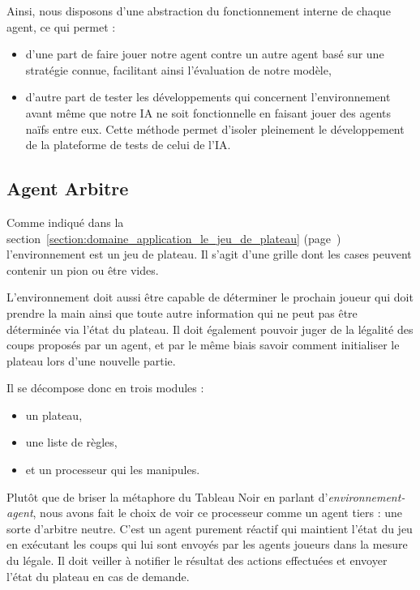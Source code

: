 Ainsi, nous disposons d'une abstraction du fonctionnement interne de chaque agent, ce qui permet :
\begin{itemize}
\item d'une part de faire jouer notre agent contre un autre agent basé sur une stratégie connue, facilitant ainsi l'évaluation de notre modèle,
\item d'autre part de tester les développements qui concernent l'environnement avant même que notre IA ne soit fonctionnelle en faisant jouer des agents naïfs entre eux. Cette méthode permet d'isoler pleinement le développement de la plateforme de tests de celui de l'IA.
\end{itemize}

\subsection{ Agent \og Arbitre \fg{} }

Comme indiqué dans la section~\ref{section:domaine_application_le_jeu_de_plateau} (page~\pageref{section:domaine_application_le_jeu_de_plateau}) l'environnement est un jeu de plateau. Il s'agit d'une grille dont les cases peuvent contenir un pion ou être vides.

L'environnement doit aussi être capable de déterminer le prochain joueur qui doit prendre la main ainsi que toute autre information qui ne peut pas être déterminée via l'état du plateau. Il doit également pouvoir juger de la légalité des coups proposés par un agent, et par le même biais savoir comment initialiser le plateau lors d'une nouvelle partie.

Il se décompose donc en trois modules :
\begin{itemize}
\item un plateau,
\item une liste de règles,
\item et un processeur qui les manipules.
\end{itemize}

Plutôt que de briser la métaphore du \og Tableau Noir \fg{} en parlant d'\emph{environnement-agent}, nous avons fait le choix de voir ce processeur comme un agent tiers : une sorte d'arbitre neutre. C'est un agent purement réactif qui maintient l'état du jeu en exécutant les coups qui lui sont envoyés par les agents joueurs dans la mesure du légale. Il doit veiller à notifier le résultat des actions effectuées et envoyer l'état du plateau en cas de demande.

